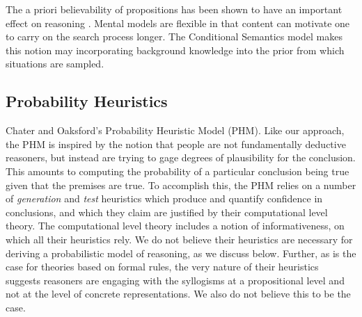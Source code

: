 \documentclass[10pt,letterpaper]{article}
\begin{document}
The a priori believability of propositions has been shown to have an important effect on reasoning \cite{Oakhill1989}. Mental models are flexible in that content can motivate one to carry on the search process longer. The Conditional Semantics model makes this notion may incorporating background knowledge into the prior from which situations are sampled. 


%

\subsection{Probability Heuristics}

 Chater and Oaksford's Probability Heuristic Model (PHM). Like our approach, the PHM is inspired by the notion that people are not fundamentally deductive reasoners, but instead are trying to gage degrees of plausibility for the conclusion. This amounts to computing the probability of a particular conclusion being true given that the premises are true. To accomplish this, the PHM relies on a number of {\em generation} and {\em test} heuristics which produce and quantify confidence in conclusions, and which they claim are justified by their computational level theory. The computational level theory includes a notion of informativeness, on which all their heuristics rely. We do not believe their heuristics are necessary for deriving a probabilistic model of reasoning, as we discuss below. Further, as is the case for theories based on formal rules, the very nature of their heuristics suggests reasoners are engaging with the syllogisms at a propositional level and not at the level of concrete representations. We also do not believe this to be the case.
\end{document}
